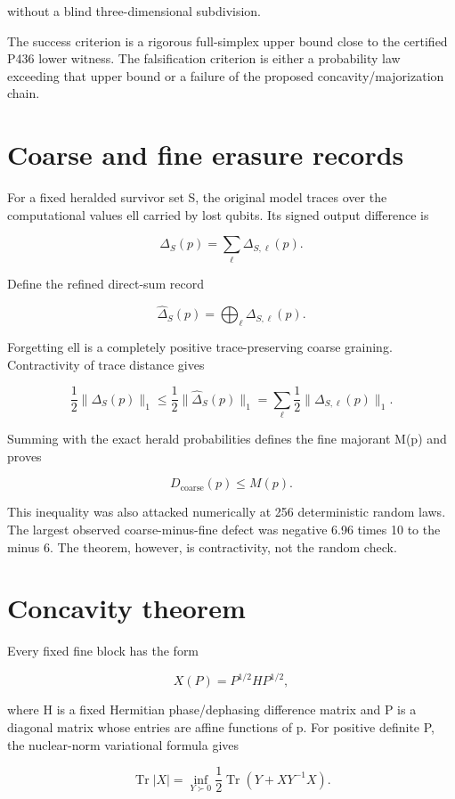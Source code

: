 \documentclass[11pt,a4paper,openany]{report}
\begin{document}
without a blind three-dimensional subdivision.

The success criterion is a rigorous full-simplex upper bound close to the certified P436 lower witness. The falsification criterion is either a probability law exceeding that upper bound or a failure of the proposed concavity/\allowbreak{}majorization chain.

\section{Coarse and fine erasure records}

For a fixed heralded survivor set S, the original model traces over the computational values ell carried by lost qubits. Its signed output difference is

\[
\Delta_S(p)=\sum_\ell\Delta_{S,\ell}(p).
\]

Define the refined direct-sum record

\[
\widehat\Delta_S(p)
=\bigoplus_\ell\Delta_{S,\ell}(p).
\]

Forgetting ell is a completely positive trace-preserving coarse graining. Contractivity of trace distance gives

\[
\frac12\|\Delta_S(p)\|_1
\le
\frac12\|\widehat\Delta_S(p)\|_1
=\sum_\ell\frac12\|\Delta_{S,\ell}(p)\|_1.
\]

Summing with the exact herald probabilities defines the fine majorant M(p) and proves

\[
D_{\mathrm{coarse}}(p)\le M(p).
\]

This inequality was also attacked numerically at 256 deterministic random laws. The largest observed coarse-minus-fine defect was negative 6.96 times 10 to the minus 6. The theorem, however, is contractivity, not the random check.

\section{Concavity theorem}

Every fixed fine block has the form

\[
X(P)=P^{1/2}HP^{1/2},
\]

where H is a fixed Hermitian phase/\allowbreak{}dephasing difference matrix and P is a diagonal matrix whose entries are affine functions of p. For positive definite P, the nuclear-norm variational formula gives

\[
\operatorname{Tr}|X|
=\inf_{Y\succ0}
\frac12\operatorname{Tr}
\left(Y+XY^{-1}X\right).
\]
\end{document}

